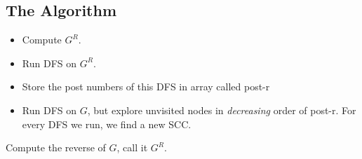 \documentclass[10pt]{article}
\begin{document}
	\subsection{The Algorithm}
	\begin{itemize}
		\item Compute $G^R$.
		\item Run DFS on $G^R$.
		\item Store the post numbers of this DFS in array called post-r 
		\item Run DFS on $G$, but explore unvisited nodes in \textit{decreasing} order of post-r. For every 
			DFS we run, we find a new SCC.
	\end{itemize}
	Compute the reverse of $G$, call it $G^R$. 
\end{document}
